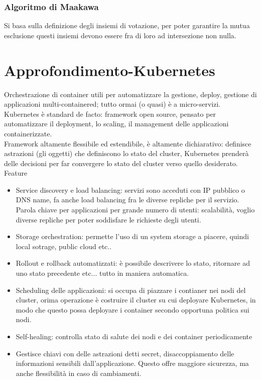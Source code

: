 \documentclass[16px]{article}
\begin{document}
\subsubsection{Algoritmo di Maakawa}
Si basa sulla definizione degli insiemi di votazione, per poter garantire la mutua esclusione questi insiemi devono essere fra di loro ad intersezione non nulla.
\section{Approfondimento-Kubernetes}
Orchestrazione di container utili per automatizzare la gestione, deploy, gestione di applicazioni multi-containered; tutto ormai (o quasi) è a micro-servizi. Kubernetes è standard de facto: framework open source, pensato per automatizzare il deployment, lo scaling, il management delle applicazioni containerizzate.\\ Framework altamente flessibile ed estendibile, è altamente dichiarativo: definisce astrazioni (gli oggetti) che definiscono lo stato del cluster, Kubernetes prenderà delle decisioni per far convergere lo stato del cluster verso quello desiderato.\\ Feature
\begin{itemize}
\item Service discovery e load balancing: servizi sono acceduti con IP pubblico o DNS name, fa anche load balancing fra le diverse repliche per il servizio. Parola chiave per applicazioni per grande numero di utenti: scalabilità, voglio diverse repliche per poter soddisfare le richieste degli utenti.
\item Storage orchestration: permette l'uso di un system storage a piacere, quindi local sotrage, public cloud etc..
\item Rollout e rollback automatizzati: è possibile descrivere lo stato, ritornare ad uno stato precedente etc... tutto in maniera automatica.
\item Scheduling delle applicazioni: si occupa di piazzare i contianer nei nodi del cluster, orima operazione è costruire il cluster su cui deployare Kubernetes, in modo che questo possa deployare i container secondo opportuna politica sui nodi.
\item Self-healing: controlla stato di salute dei nodi e dei container periodicamente
\item Gestisce chiavi con delle astrazioni detti secret, disaccoppiamento delle informazioni sensibili dall'applicazione. Questo offre maggiore sicurezza, ma anche flessibilità in caso di cambiamenti.
\end{itemize}
\end{document}
